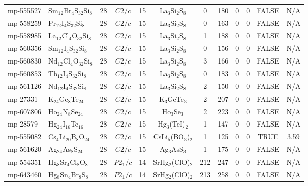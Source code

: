{\begin{longtable}{llcccccccccc}
    mp-555527 & Sm$_{12}$Br$_{4}$S$_{32}$Si$_{8}$ & 28    & $C2/c$ & 15    & La$_{3}$Si$_{2}$S$_{8}$ & 0     & 180   & 0     & 0     & FALSE & N/A \\
    mp-558259 & Pr$_{12}$I$_{4}$S$_{32}$Si$_{8}$ & 28    & $C2/c$ & 15    & La$_{3}$Si$_{2}$S$_{8}$ & 0     & 163   & 0     & 0     & FALSE & N/A \\
    mp-558985 & La$_{12}$Cl$_{4}$O$_{32}$Si$_{8}$ & 28    & $C2/c$ & 15    & La$_{3}$Si$_{2}$S$_{8}$ & 1     & 188   & 0     & 0     & FALSE & N/A \\
    mp-560356 & Sm$_{12}$I$_{4}$S$_{32}$Si$_{8}$ & 28    & $C2/c$ & 15    & La$_{3}$Si$_{2}$S$_{8}$ & 0     & 156   & 0     & 0     & FALSE & N/A \\
    mp-560830 & Nd$_{12}$Cl$_{4}$O$_{32}$Si$_{8}$ & 28    & $C2/c$ & 15    & La$_{3}$Si$_{2}$S$_{8}$ & 3     & 166   & 0     & 0     & FALSE & N/A \\
    mp-560853 & Tb$_{12}$I$_{4}$S$_{32}$Si$_{8}$ & 28    & $C2/c$ & 15    & La$_{3}$Si$_{2}$S$_{8}$ & 0     & 183   & 0     & 0     & FALSE & N/A \\
    mp-561126 & Nd$_{12}$I$_{4}$S$_{32}$Si$_{8}$ & 28    & $C2/c$ & 15    & La$_{3}$Si$_{2}$S$_{8}$ & 2     & 150   & 0     & 0     & FALSE & N/A \\
    mp-27331 & K$_{24}$Ge$_{8}$Te$_{24}$ & 28    & $C2/c$ & 15    & K$_{3}$GeTe$_{3}$ & 2     & 207   & 0     & 0     & FALSE & N/A \\
    mp-607806 & Ho$_{24}$N$_{8}$Se$_{24}$ & 28    & $C2/c$ & 15    & Ho$_{3}$Se$_{3}$ & 2     & 223   & 0     & 0     & FALSE & N/A \\
    mp-28579 & Hg$_{24}$I$_{16}$Te$_{16}$ & 28    & $C2/c$ & 15    & Hg$_{3}$(TeI)$_{2}$ & 1     & 147   & 0     & 0     & FALSE & N/A \\
    mp-555082 & Cs$_{4}$Li$_{20}$B$_{8}$O$_{24}$ & 28    & $C2/c$ & 15    & CsLi$_{5}$(BO$_{3}$)$_{2}$ & 1     & 125   & 0     & 0     & TRUE  & 3.59  \\
    mp-561620 & Ag$_{24}$As$_{8}$S$_{24}$ & 28    & $C2/c$ & 15    & Ag$_{3}$AsS$_{3}$ & 1     & 175   & 0     & 0     & FALSE & N/A \\
    mp-554351 & Hg$_{8}$Sr$_{4}$Cl$_{8}$O$_{8}$ & 28    & $P2_1/c$ & 14    & SrHg$_{2}$(ClO)$_{2}$ & 212   & 247   & 0     & 0     & FALSE & N/A \\
    mp-643460 & Hg$_{8}$Sn$_{4}$Br$_{8}$S$_{8}$ & 28    & $P2_1/c$ & 14    & SrHg$_{2}$(ClO)$_{2}$ & 213   & 258   & 0     & 0     & FALSE & N/A \\

\end{longtable}}
